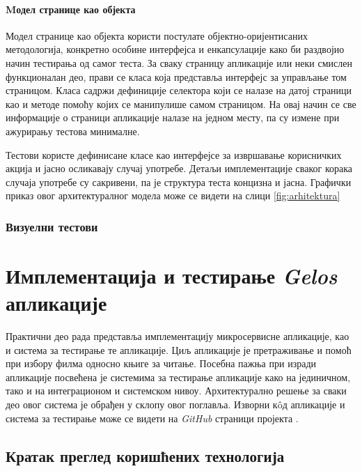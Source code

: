 \documentclass[12pt,oneside]{memoir}
\begin{document}
\subsubsection{Mодел странице као објекта}

Модел странице као објекта користи постулате објектно-оријентисаних методологија, конкретно особине интерфејса и енкапсулације како би раздвојио начин тестирања од самог теста.
За сваку страницу апликације или неки смислен функционалан део, прави се класа која представља интерфејс за управљање том страницом. Класа садржи дефиниције селектора који се налазе на датој страници као и методе помоћу којих се манипулише самом страницом. На овај начин се све информације о страници апликације налазе на једном месту, па су измене при ажурирању тестова минималне. 

Тестови користе дефинисане класе као интерфејсе за извршавање корисничких акција и јасно осликавају случај употребе. Детаљи имплементације сваког корака случаја употребе су сакривени, па је структура теста концизна и јасна. Графички приказ овог архитектуралног модела може се видети на слици \ref{fig:arhitektura}




\subsection{Визуелни тестови}


\chapter{Имплементација и тестирање \textit{Gelos} апликације}
\label{chp:aplikacija}
Практични део рада представља имплементацију микросервисне апликације, као и система за тестирање те апликације. Циљ апликације је претраживање и помоћ при избору филма односно књиге за читање. Посебна пажња при изради апликације посвећена је системима за тестирање апликације како на јединичном, тако и на интеграционом и системском нивоу. Архитектурално решење за сваки део овог система је обрађен у склопу овог поглавља. Изворни к\^{o}д апликације и система за тестирање може се видети на \textit{GitHub} страници пројекта \cite{projekat}.

\section{Кратак преглед коришћених технологија}
\label{chp:tehnologije}
\end{document}
